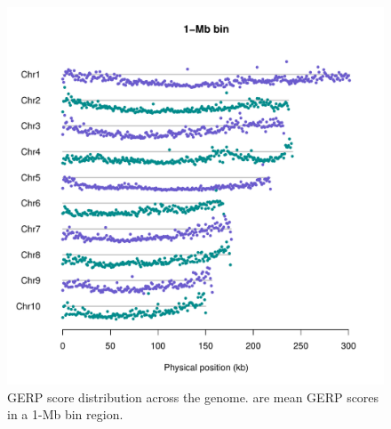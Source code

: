 \documentclass[9pt,twocolumn,twoside]{gsajnl}
\begin{document}
\begin{figure}[htbp]
\centering
\includegraphics[width=\linewidth]{SFig_gerp_dis1m.pdf}
\caption{GERP score distribution across the genome. \DIFdelbeginFL {}\DIFdelendFL \DIFaddbeginFL {}\DIFaddendFL are \DIFdelbeginFL {}\DIFdelendFL mean GERP scores in a 1-Mb bin region.}
\label{fig:dis1m}
\end{figure}
\end{document}
